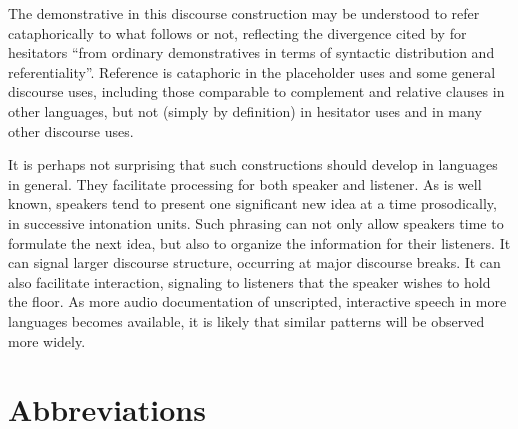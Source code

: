 \documentclass[output=paper]{langscibook}
\begin{document}
The demonstrative in this discourse construction may be understood to refer cataphorically to what follows or not, reflecting the divergence cited by \citet{HayashiYoon2006} for hesitators “from ordinary demonstratives in terms of syntactic distribution and referentiality”. Reference is cataphoric in the placeholder uses and some general discourse uses, including those comparable to complement and relative clauses in other languages, but not (simply by definition) in hesitator uses and in many other discourse uses.

It is perhaps not surprising that such constructions should develop in languages in general. They facilitate processing for both speaker and listener. As is well known, speakers tend to present one significant new idea at a time prosodically, in successive intonation units. Such phrasing can not only allow speakers time to formulate the next idea, but also to organize the information for their listeners. It can signal larger discourse structure, occurring at major discourse breaks. It can also facilitate interaction, signaling to listeners that the speaker wishes to hold the floor. As more audio documentation of unscripted, interactive speech in more languages becomes available, it is likely that similar patterns will be observed more widely.

\section*{Abbreviations}
\end{document}
